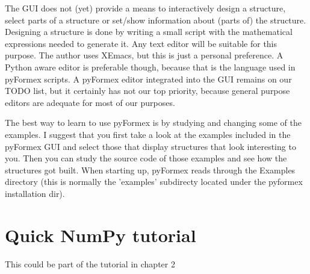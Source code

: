 \documentclass[a4paper]{manual}
\newcommand{\pyformex}{pyFormex\xspace}
\begin{document}
The GUI does not (yet) provide a means to interactively design a structure, select parts of a structure or set/show information about (parts of) the structure. Designing a structure is done by writing a small script with the mathematical expressions needed to generate it. Any text editor will be suitable for this purpose. The author uses XEmacs, but this is just a personal preference. 
A Python aware editor is preferable though, because that is the language used in \pyformex scripts.
A \pyformex editor integrated into the GUI remains on our TODO list, but it certainly has not our top priority, because general purpose editors are adequate for most of our purposes. 

The best way to learn to use \pyformex is by studying and changing some of the examples. I suggest that you first take a look at the examples included in the \pyformex GUI and select those that display structures that look interesting to you. Then you can study the source code of those examples and see how the structures got built. 
When starting up, \pyformex reads through the Examples directory (this is normally the 'examples' subdirecty located under the pyformex installation dir).  


\section{Quick NumPy tutorial}
\label{sec:numpy-tutorial}
This could be part of the tutorial in chapter 2

\end{document}
